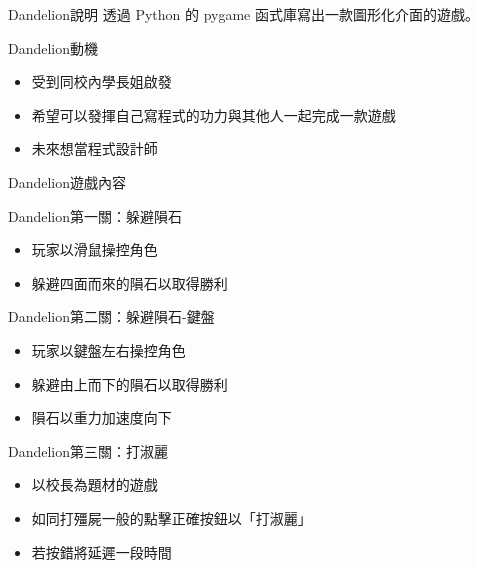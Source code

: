 \documentclass{article}
\begin{document}

\begin{large}
\begin{boxpar}{Dandelion}{說明}
透過 Python 的 pygame 函式庫寫出一款圖形化介面的遊戲。
\end{boxpar}
\begin{boxpar}{Dandelion}{動機}
    \begin{itemize}
\item 受到同校內學長姐啟發
\item 希望可以發揮自己寫程式的功力與其他人一起完成一款遊戲
\item 未來想當程式設計師
    \end {itemize}
\end{boxpar}
\begin{boxpar}{Dandelion}{遊戲內容}
    \begin{boxpar}{Dandelion}{第一關：躲避隕石}
        \begin{itemize}
            \item 玩家以滑鼠操控角色
            \item 躲避四面而來的隕石以取得勝利
        \end{itemize}
    \end{boxpar}
    \begin{boxpar}{Dandelion}{第二關：躲避隕石-鍵盤}
   \begin{itemize}
        \item 玩家以鍵盤左右操控角色
        \item 躲避由上而下的隕石以取得勝利
        \item 隕石以重力加速度向下
   \end{itemize}
    \end{boxpar}
    \begin{boxpar}{Dandelion}{第三關：打淑麗}
   \begin{itemize}
        \item 以校長為題材的遊戲
        \item 如同打殭屍一般的點擊正確按鈕以「打淑麗」
        \item 若按錯將延遲一段時間
   \end{itemize}
    \end{boxpar}
 \end{boxpar}


\end{large}
\end{document}
